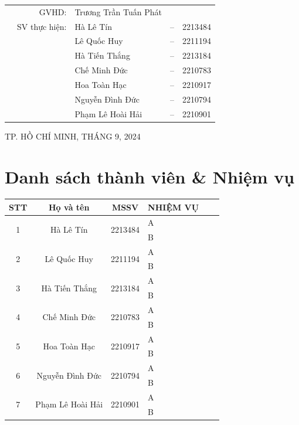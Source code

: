 \documentclass[a4paper]{article}
\begin{document}
\begin{titlepage}
	\begin{table}[h]
		\centering
		\begin{tabular}{rrlcl}
			\hspace{2.25 cm} & GVHD: & Trương Trần Tuấn Phát & & \\
			& SV thực hiện: & Hà Lê Tín   & -- & 2213484 \\
            & & Lê Quốc Huy & -- & 2211194\\
            & & Hà Tiến Thắng & -- & 2213184 \\
            & & Chế Minh Đức & -- & 2210783 \\
            & & Hoa Toàn Hạc & -- & 2210917 \\
            & & Nguyễn Đình Đức & -- & 2210794 \\
            & & Phạm Lê Hoài Hải & -- & 2210901 \\
		\end{tabular}
	\end{table}


\begin{center}
{\footnotesize TP. HỒ CHÍ MINH, THÁNG 9, 2024}
\end{center}
\end{titlepage}


\section*{Danh sách thành viên \& Nhiệm vụ }

\begin{center}
\begin{tabular}{|c|c|c|l|c|c|}
\hline
\textbf{STT} & \textbf{Họ và tên} & \textbf{MSSV} & \textbf{NHIỆM VỤ}\\
\hline 
\multirow{2}{*}{1} & \multirow{2}{*}{Hà Lê Tín} & \multirow{2}{*}{2213484} & A \\
 & &  & B\\
\hline 
\multirow{2}{*}{2} & \multirow{2}{*}{Lê Quốc Huy} & \multirow{2}{*}{2211194} & A \\
 & &  & B\\
\hline 
\multirow{2}{*}{3} & \multirow{2}{*}{Hà Tiến Thắng} & \multirow{2}{*}{2213184} & A \\
 & &  & B\\
\hline 
\multirow{2}{*}{4} & \multirow{2}{*}{Chế Minh Đức} & \multirow{2}{*}{2210783} & A \\
 & &  & B\\
\hline 
\multirow{2}{*}{5} & \multirow{2}{*}{Hoa Toàn Hạc} & \multirow{2}{*}{2210917} & A \\
 & &  & B\\
\hline
\multirow{2}{*}{6} & \multirow{2}{*}{Nguyễn Đình Đức} & \multirow{2}{*}{2210794} & A \\
 & &  & B\\
\hline 
\multirow{2}{*}{7} & \multirow{2}{*}{Phạm Lê Hoài Hải} & \multirow{2}{*}{2210901} & A \\
 & &  & B\\
\hline 
\end{tabular}
\end{center}
\newpage
\tableofcontents
\newpage
\end{document}
